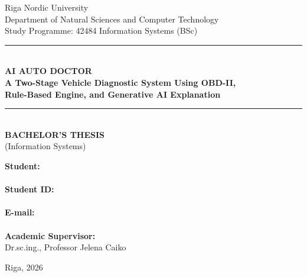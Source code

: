 \begin{titlepage}
  \centering
  \vspace*{10mm}

  {\large Riga Nordic University}\\[4pt]
  {\normalsize Department of Natural Sciences and Computer Technology}\\[4pt]
  {\normalsize Study Programme: 42484 Information Systems (BSc)}\\[20pt]

  \noindent\rule{0.80\linewidth}{1.2pt}\\[20pt]

  {\LARGE\bfseries AI AUTO DOCTOR}\\[12pt]

  {\large\bfseries
    A Two-Stage Vehicle Diagnostic System Using OBD-II,\\
    Rule-Based Engine, and Generative AI Explanation
  }\\[20pt]

  \noindent\rule{0.80\linewidth}{1.2pt}\\[30pt]

  {\large\bfseries BACHELOR'S THESIS}\\[6pt]
  {\normalsize (Information Systems)}\\[50pt]

  \begin{flushleft}
    \hspace{0.38\linewidth}%
    \begin{minipage}{0.58\linewidth}
      \normalsize
      \textbf{Student:}\\
      \quad [NAME]\\[8pt]
      \textbf{Student ID:}\\
      \quad [GROUP]\\[8pt]
      \textbf{E-mail:}\\
      \quad [EMAIL]\\[16pt]
      \textbf{Academic Supervisor:}\\
      \quad Dr.sc.ing., Professor Jelena Caiko
    \end{minipage}
  \end{flushleft}

  \vfill
  {\normalsize Riga, 2026}
\end{titlepage}
\clearpage
